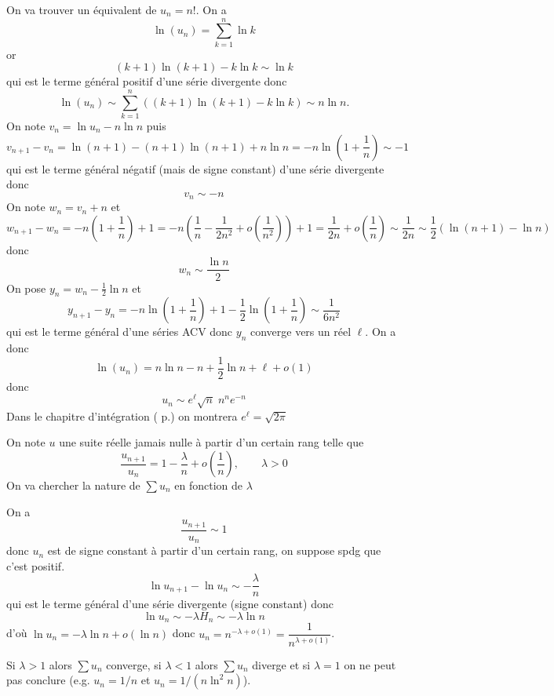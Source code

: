 \begin{ex}
    On va trouver un équivalent de $u_n=n!$. On a \[
        \ln(u_n)=\sum_{k=1}^n\ln k
    \]
    or \[
        (k+1)\ln(k+1)-k\ln k\sim \ln k
    \]
    qui est le terme général positif d'une série divergente donc \[
        \ln (u_n)\sim\sum_{k=1}^n((k+1)\ln(k+1)-k\ln k)\sim n\ln n.
    \]
    On note $v_n=\ln u_n-n\ln n$ puis \[
        v_{n+1}-v_n=\ln(n+1)-(n+1)\ln(n+1)+n\ln n=-n\ln \left( 1+\frac1n \right)\sim -1
    \]
    qui est le terme général négatif (mais de signe constant) d'une série divergente donc \[
        v_n\sim -n
    \]
    On note $w_n=v_n+n$ et \[
        w_{n+1}-w_n=-n \left( 1+\frac1n \right)+1=-n \left( \frac1n-\frac1{2n^2}+o \left( \frac1{n^2} \right) \right)+1=\frac1{2n}+o \left( \frac1n \right)\sim\frac1{2n}\sim \frac12 (\ln(n+1)-\ln n)
    \]
    donc \[
        w_n\sim \frac{\ln n}2
    \]
    On pose $y_n=w_n-\frac12\ln n$ et \[
        y_{n+1}-y_n=-n\ln \left( 1+\frac1n \right)+1-\frac12\ln \left( 1+\frac1n \right)\sim\frac1{6n^2}
    \]
    qui est le terme général d'une séries ACV donc $y_n$ converge vers un réel $\ell$.
    On a donc \[
        \ln(u_n)=n\ln n-n+\frac12\ln n+\ell+o(1)
    \]
    donc \[
        u_n\sim e^\ell\sqrt n\; n^ne^{-n}
    \]
    Dans le chapitre d'intégration \ifsolo\else(\textbf{} p.\pageref{sec:wallis})\fi{} on montrera $e^\ell=\sqrt{2\pi}$
\end{ex}

\begin{ex}
    On note $u$ une suite réelle jamais nulle à partir d'un certain rang telle que \[
        \frac{u_{n+1}}{u_n}=1-\frac\lambda n+o \left( \frac1n \right), \qquad \lambda>0
    \]
    On va chercher la nature de $\sum u_n$ en fonction de $\lambda$

    On a \[
        \frac{u_{n+1}}{u_n}\sim 1
    \]
    donc $u_n$ est de signe constant à partir d'un certain rang, on suppose spdg que c'est positif. \[
        \ln u_{n+1}-\ln u_n\sim-\frac\lambda n
    \]
    qui est le terme général d'une série divergente (signe constant) donc \[
        \ln u_n\sim -\lambda H_n\sim -\lambda\ln n
    \]
    d'où $\ln u_n=-\lambda \ln n + o(\ln n)$ donc $u_n=n^{-\lambda+o(1)}=\dfrac1{n^{\lambda+o(1)}}$.

    Si $\lambda>1$ alors $\sum u_n$ converge, si $\lambda <1$ alors $\sum u_n$ diverge et si $\lambda=1$ on ne peut pas conclure (e.g. $u_n=1/n$ et $u_n=1/(n\ln^2n)$).
\end{ex}


